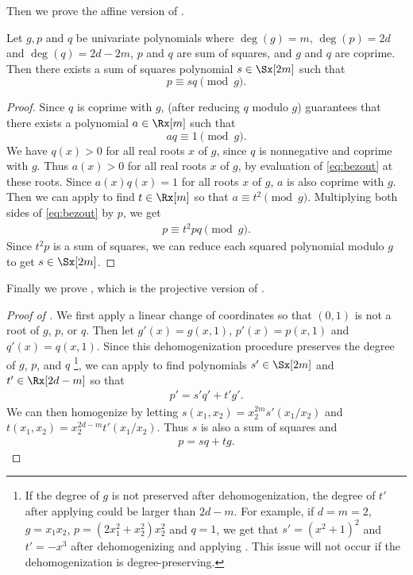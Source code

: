 \documentclass[final,onefignum,onetabnum]{siamart220329}
\begin{document}
Then we prove the affine version of .
\begin{lemma} \label{lem:group} Let $g, p$ and $q$ be univariate polynomials
  where $\deg(g) = m$, $\deg(p) = 2d$ and $\deg(q) = 2d-2m$, $p$ and $q$ are sum
  of squares, and $g$ and $q$ are coprime. Then there exists a sum of squares
  polynomial $s \in \Sx[2m]$ such that
  \begin{equation*}
    p \equiv s q \pmod{g}.
  \end{equation*}
\end{lemma}
\begin{proof}
	Since $q$ is coprime with $g$,  (after reducing $q$ modulo
  $g$) guarantees that there exists a polynomial $a \in \Rx[m]$ such that
  \begin{equation}
    \label{eq:bezout}
    aq \equiv 1 \pmod{g}.
  \end{equation}
  We have $q(x) > 0$ for all real roots $x$ of $g$, since $q$ is nonnegative
  and coprime with $g$. Thus $a(x) > 0$ for all real roots $x$ of $g$, by
  evaluation of \eqref{eq:bezout} at these roots. Since $a(x)q(x) = 1$ for all
  roots $x$ of $g$, $a$ is also coprime with $g$. Then we can apply
   to find $t \in \Rx[m]$ so that $a \equiv t^2
  \pmod{g}$. Multiplying both sides of \eqref{eq:bezout} by $p$, we get
  \begin{align*}
    p \equiv t^2 p q \pmod{g}.
  \end{align*}
  Since $t^2p$ is a sum of squares, we can reduce each squared polynomial modulo
  $g$ to get $s \in \Sx[2m]$.
\end{proof}

Finally we prove , which is the projective version of
.
\begin{proof}[Proof of ]
  We first apply a linear change of coordinates so that $(0, 1)$ is not a root
  of $g$, $p$, or $q$. Then let $g'(x) = g(x, 1)$, $p'(x) = p(x, 1)$ and
  $q'(x) = q(x, 1)$. Since this dehomogenization procedure preserves the degree
  of $g$, $p$, and $q$ \footnote{If the degree of $g$ is not preserved after
    dehomogenization, the degree of $t'$ after applying  could
    be larger than $2d-m$. For example, if $d=m=2$, $g=x_1x_2$,
    $p = (2x_1^2+x_2^2)x_2^2$ and $q=1$, we get that $s' = (x^2+1)^2$ and
    $t'=-x^3$ after dehomogenizing and applying . This issue
    will not occur if the dehomogenization is degree-preserving.}, we can apply
   to find polynomials $s' \in \Sx[2m]$ and $t' \in \Rx[2d-m]$
  so that
  \begin{align*}
    p' = s' q' + t'g'.
  \end{align*}
  We can then homogenize by letting $s(x_1, x_2) = x_2^{2m} s'(x_1/x_2)$ and
  $t(x_1, x_2) = x_2^{2d-m} t'(x_1/x_2)$. Thus $s$ is also a sum of squares and
  \begin{align*}
    p = s q + tg.
  \end{align*}
\end{proof}
\end{document}
